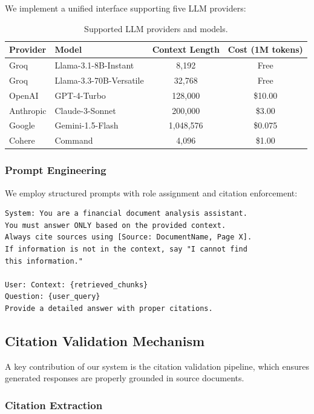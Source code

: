 \documentclass[runningheads]{llncs}
\begin{document}
We implement a unified interface supporting five LLM providers:

\begin{table}[h]
\centering
\caption{Supported LLM providers and models.}
\label{tab:llm_providers}
\begin{tabular}{llcc}
\toprule
\textbf{Provider} & \textbf{Model} & \textbf{Context Length} & \textbf{Cost (1M tokens)} \\
\midrule
Groq & Llama-3.1-8B-Instant & 8,192 & Free \\
Groq & Llama-3.3-70B-Versatile & 32,768 & Free \\
OpenAI & GPT-4-Turbo & 128,000 & \$10.00 \\
Anthropic & Claude-3-Sonnet & 200,000 & \$3.00 \\
Google & Gemini-1.5-Flash & 1,048,576 & \$0.075 \\
Cohere & Command & 4,096 & \$1.00 \\
\bottomrule
\end{tabular}
\end{table}

\subsubsection{Prompt Engineering}

We employ structured prompts with role assignment and citation enforcement:

\begin{verbatim}
System: You are a financial document analysis assistant.
You must answer ONLY based on the provided context.
Always cite sources using [Source: DocumentName, Page X].
If information is not in the context, say "I cannot find 
this information."

User: Context: {retrieved_chunks}
Question: {user_query}
Provide a detailed answer with proper citations.
\end{verbatim}

\subsection{Citation Validation Mechanism}

A key contribution of our system is the citation validation pipeline, which ensures generated responses are properly grounded in source documents.

\subsubsection{Citation Extraction}
\end{document}
